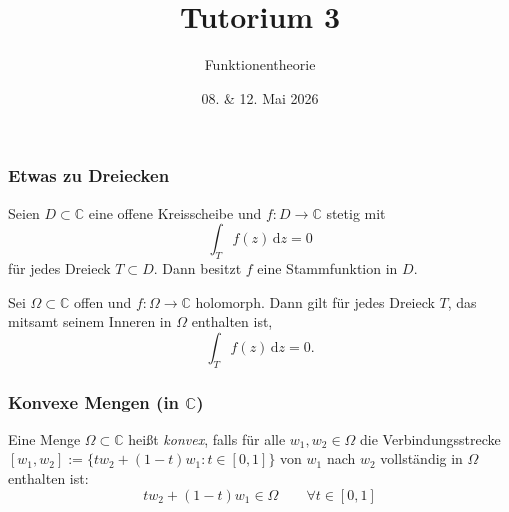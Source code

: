 \documentclass[10pt]{beamer}
\author[\url{https://fdf-uni.github.io/ft}]{}
\title{Tutorium 3}
\subtitle{\texorpdfstring{Funktionentheorie\vspace*{-1.5cm}}{Funktionentheorie}}
\date{08. \& 12. Mai 2026}
\begin{document}
\begin{frame}
	\titlepage
\end{frame}
\begin{frame}
	\frametitle{Etwas zu Dreiecken}
	\pause
	\begin{theorem}
		Seien $D \subset \mathbb{C}$ eine offene Kreisscheibe und $f \colon D \to \mathbb{C}$ stetig mit
		\[
			\int_T f(z) \,\mathrm{d}z = 0
		\]
		für jedes Dreieck $T \subset D$.
		Dann besitzt $f$ eine Stammfunktion in $D$.
	\end{theorem}
	\pause
	\begin{lemma}
		Sei $\Omega \subset \mathbb{C}$ offen und $f \colon \Omega \to \mathbb{C}$ holomorph.
		Dann gilt für jedes Dreieck $T$, das mitsamt seinem \glqq Inneren\grqq{} in $\Omega$ enthalten ist,
		\[
			\int_T f(z) \,\mathrm{d}z = 0.
		\]
	\end{lemma}
\end{frame}
\begin{frame}
	\frametitle{Konvexe Mengen (in $\mathbb{C}$)}
	\pause
	\begin{definition}
		Eine Menge $\Omega \subset \mathbb{C}$ heißt \emph{konvex}, falls für alle $w_1, w_2 \in \Omega$ die Verbindungsstrecke $[w_1, w_2] := \{t w_2 + (1 - t) w_1 : t \in [0, 1]\}$ von $w_1$ nach $w_2$ vollständig in $\Omega$ enthalten ist:
		\[
			t w_2 + (1 - t) w_1 \in \Omega \qquad \forall t \in [0, 1]
		\]
	\end{definition}
	\pause
	\begin{center}
	\end{center}
\end{frame}
\end{document}
